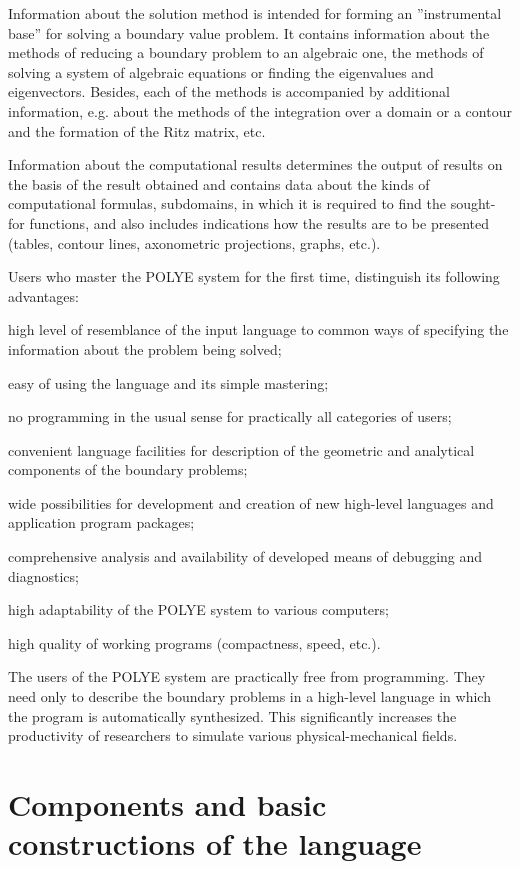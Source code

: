 Information about the solution method is intended for forming an
''instrumental base'' for solving a boundary value problem. It contains
information about the methods of reducing a boundary problem to an algebraic
one, the methods of solving a system of algebraic equations or finding the
eigenvalues and eigenvectors. Besides, each of the methods is accompanied by
additional information, e.g. about the methods of the integration over a
domain or a contour and the formation of the Ritz matrix, etc.

Information about the computational results determines the output of results
on the basis of the result obtained and contains data about the kinds of
computational formulas, subdomains, in which it is required to find the
sought-for functions, and also includes indications how the results are to
be presented (tables, contour lines, axonometric projections, graphs, etc.).

Users who master the POLYE system for the first time, distinguish its
following advantages:

high level of resemblance of the input language to common ways of specifying
the information about the problem being solved;

easy of using the language and its simple mastering;

no programming in the usual sense for practically all categories of users;

convenient language facilities for description of the geometric and
analytical components of the boundary problems;

wide possibilities for development and creation of new high-level languages
and application program packages;

comprehensive analysis and availability of developed means of debugging and
diagnostics;

high adaptability of the POLYE system to various computers;

high quality of working programs (compactness, speed, etc.).

The users of the POLYE system are practically free from programming. They
need only to describe the boundary problems in a high-level language in
which the program is automatically synthesized. This significantly increases
the productivity of researchers to simulate various physical-mechanical
fields.

\section{Components and basic constructions of the language}

